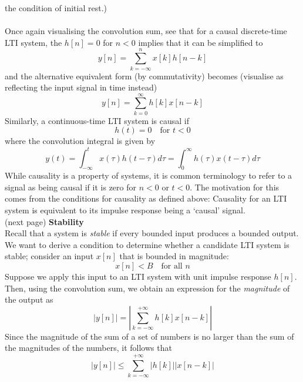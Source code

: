 \documentclass{report}
\begin{document}
the condition of initial rest.)\\
\vspace{1mm}\\
Once again visualising the convolution sum, see that for a causal discrete-time LTI system, the $h[n]=0$ for $n<0$ implies that
it can be simplified to
\begin{equation*}
y[n]=\sum^n_{k=-\infty}x[k]h[n-k]
\end{equation*}
and the alternative equivalent form (by commutativity) becomes
(visualise as reflecting the input signal in time instead)
\begin{equation*}
y[n]=\sum^\infty_{k=0}h[k]x[n-k]
\end{equation*}
Similarly, a continuous-time LTI system is causal if
\begin{equation*}
h(t)=0\quad\text{for }t<0
\end{equation*}
where the convolution integral is given by
\begin{equation*}
y(t)=\int^t_{-\infty}x(\tau)h(t-\tau)d\tau=\int^\infty_0h(\tau)x(t-\tau)d\tau
\end{equation*}
While causality is a property of systems, it is common terminology to refer to a signal as being causal if it is zero for $n<0$ or $t<0$. 
The motivation for this comes from the conditions for causality as defined above: Causality for an LTI system is equivalent to its
impulse response being a `causal' signal.\\
(next page)\newpage
\noindent\textbf{Stability}\\
Recall that a system is \textit{stable} if every bounded input produces a bounded output. We want to derive a condition to determine
whether a candidate LTI system is stable; consider an input $x[n]$ that is bounded in magnitude:
\begin{equation*}
x[n]<B\quad\text{for all }n
\end{equation*}
Suppose we apply this input to an LTI system with unit impulse response $h[n]$. Then, using the convolution sum, we obtain an expression
for the \textit{magnitude} of the output as
\begin{equation*}
|y[n]|=\left|\sum^{+\infty}_{k=-\infty}h[k]x[n-k]\right|
\end{equation*}
Since the magnitude of the sum of a set of numbers is no larger than the sum of the magnitudes of the numbers, it follows that
\begin{equation*}
|y[n]|\leq\sum^{+\infty}_{k=-\infty}|h[k]||x[n-k]|
\end{equation*}
\end{document}
